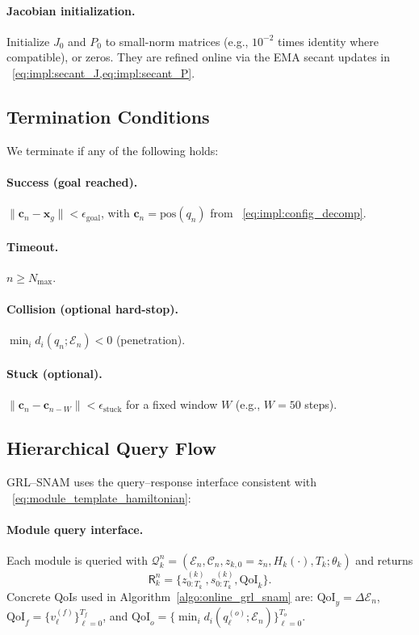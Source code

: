 \documentclass{article} %
\let\vec=\boldsymbol
\begin{document}
\paragraph{Jacobian initialization.}
Initialize $J_0$ and $P_0$ to small-norm matrices (e.g., $10^{-2}$ times identity where compatible), or
zeros. They are refined online via the EMA secant updates in ~\cref{eq:impl:secant_J,eq:impl:secant_P}.

\subsection{Termination Conditions}
\label{subsec:termination}

We terminate if any of the following holds:

\paragraph{Success (goal reached).}
$\|\vec{c}_n-\mathbf{x}_g\|<\epsilon_{\text{goal}}$, with $\vec c_n=\mathrm{pos}(q_n)$ from ~\cref{eq:impl:config_decomp}.

\paragraph{Timeout.}
$n\ge N_{\max}$.

\paragraph{Collision (optional hard-stop).}
$\min_i d_i(q_n;\mathcal{E}_n)<0$ (penetration).

\paragraph{Stuck (optional).}
$\|\vec{c}_n-\vec{c}_{n-W}\|<\epsilon_{\text{stuck}}$ for a fixed window $W$ (e.g., $W{=}50$ steps).

\subsection{Hierarchical Query Flow}
\label{subsec:hierarchical_queries}

GRL--SNAM uses the query--response interface consistent with ~\cref{eq:module_template_hamiltonian}:

\paragraph{Module query interface.}
Each module is queried with $\mathcal{Q}_k^n=(\mathcal{E}_n,\mathcal{C}_n,z_{k,0}{=}z_n,H_k(\cdot),T_k;\theta_k)$ and returns
\[
\mathsf{R}_k^n=\{z_{0:T_k}^{(k)},s_{0:T_k}^{(k)},\mathrm{QoI}_k\}.
\]
Concrete QoIs used in Algorithm~\cref{algo:online_grl_snam} are:
$\mathrm{QoI}_y=\Delta\mathcal{E}_n$,
$\mathrm{QoI}_f=\{v_\ell^{(f)}\}_{\ell=0}^{T_f}$, and
$\mathrm{QoI}_o=\{\min_i d_i(q_\ell^{(o)};\mathcal{E}_n)\}_{\ell=0}^{T_o}$.
\end{document}
